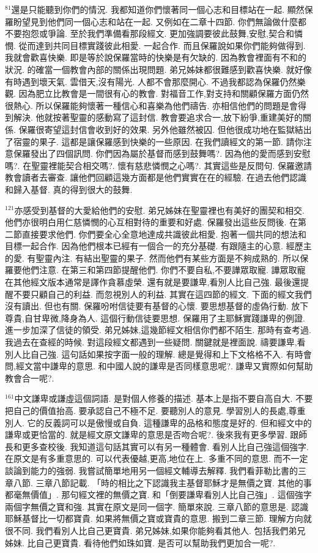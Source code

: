 \documentclass{book}
\begin{document}
$^{81}$還是只能聽到你們的情況.
我都知道你們懷著同一個心志和目標站在一起.
顯然保羅盼望見到他們同一個心志和站在一起.
又例如在二章十四節.
你們無論做什麼都不要抱怨或爭論.
至於我們準備看那段經文.
更加強調要彼此鼓舞,安慰,契合和憐憫.
從而達到共同目標實踐彼此相愛.
一起合作.
而且保羅說如果你們能夠做得到.
我就會歡喜快樂.
即是等於說保羅當時的快樂是有欠缺的.
因為教會裡面有不和的狀況.
的確當一個教會內部的關係出現問題.
弟兄姊妹都很難感到歡喜快樂.
就好像有時遇到壞天氣.
雲借天,沒有陽光.
人都不會那麼開心.
不過我都認為保羅仍然樂觀.
因為肥立比教會是一間很有心的教會.
對福音工作,對支持和關顧保羅方面仍然很熱心.
所以保羅能夠懷著一種信心和喜樂為他們禱告.
亦相信他們的問題是會得到解決.
他就按著聖靈的感動寫了這封信.
教會要追求合一,放下紛爭,重建美好的關係.
保羅很寄望這封信會收到好的效果.
另外他雖然被囚.
但他很成功地在監獄結出了宿靈的果子.
這都是讓保羅感到快樂的一些原因.
在我們讀經文的第一節.
請你注意保羅發出了四個訊問.
你們因為屬於基督而感到鼓舞嗎?.
因為他的愛而感到安慰嗎?.
在聖靈裡能契合相交嗎?.
懷有慈悲憐憫之心嗎?.
其實這些是反問句.
保羅邀請教會讀者去審查.
讓他們回顧這幾方面都是他們實實在在的經驗.
在過去他們認識和歸入基督.
真的得到很大的鼓舞.

$^{121}$亦感受到基督的大愛給他們的安慰.
弟兄姊妹在聖靈裡也有美好的團契和相交.
他們亦很明白用仁慈憐憫的心互相對待的重要和好處.
保羅發出這些反問後.
在第二節直接要求他們.
你們要全心全意地達成共識彼此相愛.
抱著一個共同的想法和目標一起合作.
因為他們根本已經有一個合一的充分基礎.
有跟隨主的心意.
經歷主的愛.
有聖靈內注.
有結出聖靈的果子.
然而他們有某些方面是不夠成熟的.
所以保羅要他們注意.
在第三和第四節提醒他們.
你們不要自私,不要譁眾取寵.
譁眾取寵在其他經文版本通常是譯作貪慕虛榮.
還有就是要謙卑,看別人比自己強.
最後還提醒不要只顧自己的利益.
而忽視別人的利益.
其實在這四節的經文.
下面的經文我們沒有讀出.
但也有關.
保羅吩咐信徒要有基督的心懷.
要思想基督的虛偽行動.
放下尊貴,自甘卑微,降身為人.
這個行動信徒要思想.
保羅用了主耶穌實踐謙卑的例證.
進一步加深了信徒的領受.
弟兄姊妹,這幾節經文相信你們都不陌生.
那時有查考過.
我過去在查經的時候.
對這段經文都遇到一些疑問.
關鍵就是裡面說.
禱要謙卑,看別人比自己強.
這句話如果按字面一般的理解.
總是覺得和上下文格格不入.
有時會問,經文當中謙卑的意思.
和中國人說的謙卑是否同樣意思呢?.
謙卑又實際如何幫助教會合一呢?.

$^{161}$中文謙卑或謙虛這個詞語.
是對個人修養的描述.
基本上是指不要自高自大.
不要把自己的價值抬高.
要承認自己不極不足.
要聽別人的意見.
學習別人的長處,尊重別人.
它的反義詞可以是傲慢或自負.
這種謙卑的品格和態度是好的.
但和經文中的謙卑或更恰當的.
就是經文原文謙卑的意思是否吻合呢?.
後來我有更多學習.
跟師長和更多查校後.
我知道這句話其實可以有另一種體會.
看別人比自己強這個強字.
在原文是有多重意思的.
可以代表優越,更高,地位在上.
多重不同的意思.
而不一定談論到能力的強弱.
我嘗試簡單地用另一個經文輔導去解釋.
我們看菲勒比書的三章八節.
三章八節記載.
「時的相比之下認識我主基督耶穌才是無價之寶.
其他的事都毫無價值」.
那句經文裡的無價之寶.
和「倒要謙卑看別人比自己強」.
這個強字兩個字無價之寶和強.
其實在原文是同一個字.
簡單來說.
三章八節的意思是.
認識耶穌基督比一切都寶貴.
如果將無價之寶或寶貴的意思.
搬到二章三節.
理解方向就很不同.
我們看別人比自己更寶貴.
弟兄姊妹,如果你能夠看其他人.
包括我們弟兄姊妹.
比自己更寶貴.
看待他們如珠如寶.
是否可以幫助我們更加合一呢?.
\end{document}
